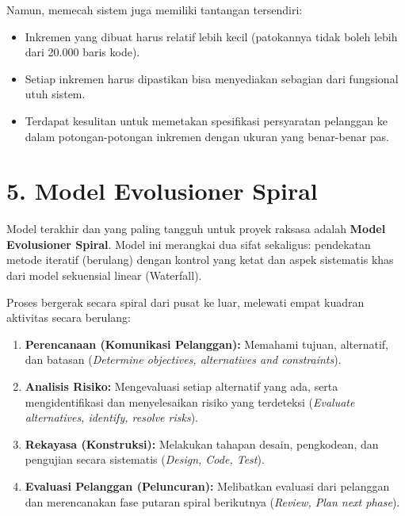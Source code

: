 \documentclass[12pt,a4paper]{article}
\begin{document}
Namun, memecah sistem juga memiliki tantangan tersendiri:
\begin{itemize}
    \item Inkremen yang dibuat harus relatif lebih kecil (patokannya tidak boleh lebih dari 20.000 baris kode).
    \item Setiap inkremen harus dipastikan bisa menyediakan sebagian dari fungsional utuh sistem.
    \item Terdapat kesulitan untuk memetakan spesifikasi persyaratan pelanggan ke dalam potongan-potongan inkremen dengan ukuran yang benar-benar pas.
\end{itemize}

\newpage
\section{5. Model Evolusioner Spiral}

Model terakhir dan yang paling tangguh untuk proyek raksasa adalah \textbf{Model Evolusioner Spiral}. Model ini merangkai dua sifat sekaligus: pendekatan metode iteratif (berulang) dengan kontrol yang ketat dan aspek sistematis khas dari model sekuensial linear (Waterfall).

Proses bergerak secara spiral dari pusat ke luar, melewati empat kuadran aktivitas secara berulang:
\begin{enumerate}
    \item \textbf{Perencanaan (Komunikasi Pelanggan):} Memahami tujuan, alternatif, dan batasan (\textit{Determine objectives, alternatives and constraints}).
    \item \textbf{Analisis Risiko:} Mengevaluasi setiap alternatif yang ada, serta mengidentifikasi dan menyelesaikan risiko yang terdeteksi (\textit{Evaluate alternatives, identify, resolve risks}).
    \item \textbf{Rekayasa (Konstruksi):} Melakukan tahapan desain, pengkodean, dan pengujian secara sistematis (\textit{Design, Code, Test}).
    \item \textbf{Evaluasi Pelanggan (Peluncuran):} Melibatkan evaluasi dari pelanggan dan merencanakan fase putaran spiral berikutnya (\textit{Review, Plan next phase}).
\end{enumerate}
\end{document}
